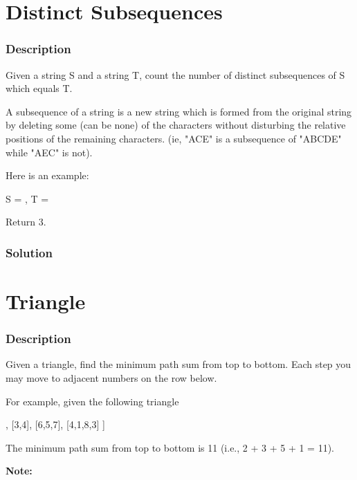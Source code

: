 \newpage


\section{Distinct Subsequences} %

\subsubsection{Description}
Given a string S and a string T, count the number of distinct subsequences of S which equals T.

A subsequence of a string is a new string which is formed from the original string by deleting some (can be none) of the characters without disturbing the relative positions of the remaining characters. (ie, "ACE" is a subsequence of "ABCDE" while "AEC" is not).

Here is an example:

S = , T = 

Return 3.

\subsubsection{Solution}

\begin{Code}

\end{Code}

\newpage

\section{Triangle} %

\subsubsection{Description}
Given a triangle, find the minimum path sum from top to bottom. Each step you may move to adjacent numbers on the row below.

For example, given the following triangle
\begin{Code}
[
     [2],
    [3,4],
   [6,5,7],
  [4,1,8,3]
]
\end{Code}

The minimum path sum from top to bottom is 11 (i.e., 2 + 3 + 5 + 1 = 11).

\textbf{Note:}

